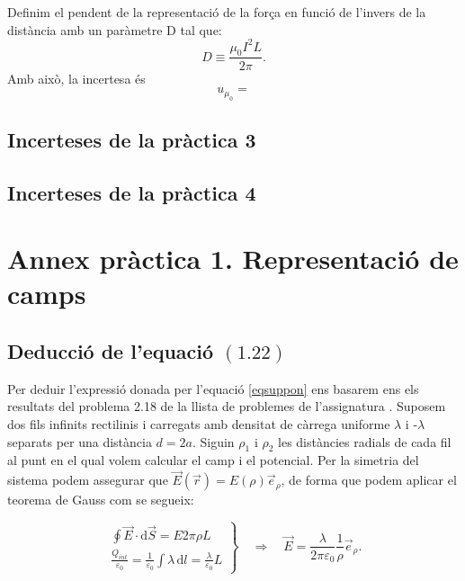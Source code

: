 \documentclass[a4paper,10.5pt]{report}
\begin{document}
\begin{appendices}
\begin{enumerate}
	Definim el pendent de la representació de la força en funció de l'invers de la distància amb un paràmetre D tal que: \begin{equation*}
		D\equiv\frac{\mu_0I^2L}{2\pi}.
	\end{equation*}
	Amb això, la incertesa és
	\begin{equation}
		u_{\mu_0}=
	\end{equation}
\end{enumerate}
\subsection{Incerteses de la pràctica 3}
\subsection{Incerteses de la pràctica 4}
\newpage
\section{Annex pràctica 1. Representació de camps}
\subsection{Deducció de l'equació $(1.22)$}
\label{an:a1}
Per deduir l'expressió donada per l'equació \eqref{eqsuppon} ens basarem ens els resultats del problema 2.18 de la llista de problemes de l'assignatura \cite{ref1}. Suposem dos fils infinits rectilinis i carregats amb densitat de càrrega uniforme $\lambda$ i -$\lambda$ separats per una distància $d=2a$. Siguin $\rho_1$ i $\rho_2$ les distàncies radials de cada fil al punt en el qual volem calcular el camp i el potencial. Per la simetria del sistema podem assegurar que $\vec{E}(\vec{r}) = E(\rho) \vec{e}_{\rho}$, de forma que podem aplicar el teorema de Gauss com se segueix:

\[
\left.
\begin{array}{c}
	\oint \vec{E} \cdot \mathrm{d}\vec{S} = E 2\pi \rho L \\[10pt]
	\frac{Q_{int}}{\varepsilon_0} = \frac{1}{\varepsilon_0} \int \lambda \, \mathrm{d}l = \frac{\lambda}{\varepsilon_0} L
\end{array}
\right\}
\quad \Rightarrow \quad 
\vec{E} = \frac{\lambda}{2\pi \varepsilon_0} \frac{1}{\rho} \vec{e}_{\rho}.
\]


\end{appendices}
\end{document}
